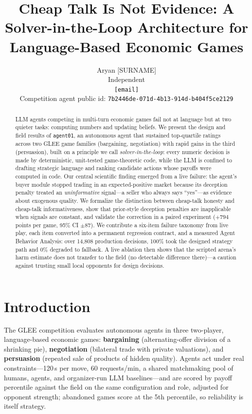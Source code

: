 \documentclass{article}
\title{Cheap Talk Is Not Evidence: A Solver-in-the-Loop Architecture for Language-Based Economic Games}
\author{Aryan [SURNAME] \\ %
  Independent \\\n  \texttt{[email]} \\\n  Competition agent public id: \texttt{7b2446de-071d-4b13-914d-b404f5ce2129}}
\begin{document}
\maketitle

\begin{abstract}
LLM agents competing in multi-turn economic games fail not at language but at two quieter tasks: computing numbers and updating beliefs. We present the design and field results of \texttt{agent01}, an autonomous agent that sustained top-quartile ratings across two GLEE game families (bargaining, negotiation) with rapid gains in the third (persuasion), built on a principle we call \emph{solver-in-the-loop}: every numeric decision is made by deterministic, unit-tested game-theoretic code, while the LLM is confined to drafting strategic language and ranking candidate actions whose payoffs were computed in code. Our central scientific finding emerged from a live failure: the agent's buyer module stopped trading in an expected-positive market because its deception penalty treated an \emph{uninformative} signal---a seller who always says ``yes''---as evidence about exogenous quality. We formalize the distinction between cheap-talk honesty and cheap-talk informativeness, show that prior-style deception penalties are inapplicable when signals are constant, and validate the correction in a paired experiment ($+794$ points per game, 95\% CI $\pm 87$). We contribute a six-item failure taxonomy from live play, each item converted into a permanent regression contract, and a measured Agent Behavior Analysis: over 14{,}808 production decisions, 100\% took the designed strategy path and 0\% degraded to fallback. A live ablation then shows that the scripted arena's harm estimate does not transfer to the field (no detectable difference there)---a caution against trusting small local opponents for design decisions.
\end{abstract}

\section{Introduction}
The GLEE competition evaluates autonomous agents in three two-player, language-based economic games: \textbf{bargaining} (alternating-offer division of a shrinking pie), \textbf{negotiation} (bilateral trade with private valuations), and \textbf{persuasion} (repeated sale of products of hidden quality). Agents act under real constraints---120\,s per move, 60 requests/min, a shared matchmaking pool of humans, agents, and organizer-run LLM baselines---and are scored by payoff percentile against the field on the same configuration and role, adjusted for opponent strength; abandoned games score at the 5th percentile, so reliability is itself strategy.
\end{document}
